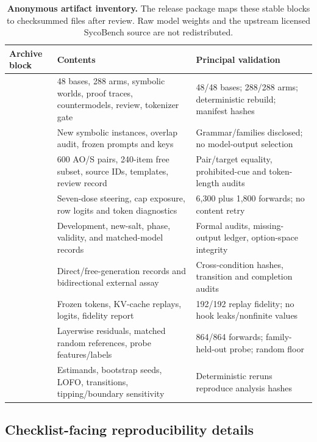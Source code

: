 \documentclass[letterpaper]{article}
\begin{document}
\begin{table}[t]
\centering
\scriptsize
\setlength{\tabcolsep}{3pt}
\renewcommand{\arraystretch}{1.12}
\begin{tabularx}{\textwidth}{@{}L{3.2cm}YY@{}}
\toprule
Archive block & Contents & Principal validation \\
\midrule
{} & 48 bases, 288 arms, symbolic worlds, proof traces, countermodels, review, tokenizer gate & 48/48 bases; 288/288 arms; deterministic rebuild; manifest hashes \\
 & New symbolic instances, overlap audit, frozen prompts and keys & Grammar/families disclosed; no model-output selection \\
 & 600 AO/S pairs, 240-item free subset, source IDs, templates, review record & Pair/target equality, prohibited-cue and token-length audits \\
 & Seven-dose steering, cap exposure, row logits and token diagnostics & 6,300 plus 1,800 forwards; no content retry \\
 & Development, new-salt, phase, validity, and matched-model records & Formal audits, missing-output ledger, option-space integrity \\
 & Direct/free-generation records and bidirectional external assay & Cross-condition hashes, transition and completion audits \\
 & Frozen tokens, KV-cache replays, logits, fidelity report & 192/192 replay fidelity; no hook leaks/nonfinite values \\
 & Layerwise residuals, matched random references, probe features/labels & 864/864 forwards; family-held-out probe; random floor \\
 & Estimands, bootstrap seeds, LOFO, transitions, tipping/boundary sensitivity & Deterministic reruns reproduce analysis hashes \\
\bottomrule
\end{tabularx}
\caption{\textbf{Anonymous artifact inventory.} The release package maps these stable blocks to checksummed files after review.  Raw model weights and the upstream licensed SycoBench source are not redistributed.}
\label{tab:supp-artifacts}
\end{table}

\subsection{Checklist-facing reproducibility details}
\end{document}
